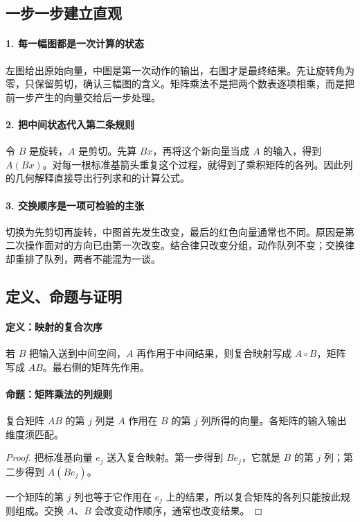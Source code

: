 \subsection*{一步一步建立直观}

\paragraph{1. 每一幅图都是一次计算的状态}

左图给出原始向量，中图是第一次动作的输出，右图才是最终结果。先让旋转角为零，只保留剪切，确认三幅图的含义。矩阵乘法不是把两个数表逐项相乘，而是把前一步产生的向量交给后一步处理。



\paragraph{2. 把中间状态代入第二条规则}

令 $B$ 是旋转，$A$ 是剪切。先算 $Bx$，再将这个新向量当成 $A$ 的输入，得到 $A(Bx)$。对每一根标准基箭头重复这个过程，就得到了乘积矩阵的各列。因此列的几何解释直接导出行列求和的计算公式。



\paragraph{3. 交换顺序是一项可检验的主张}

切换为先剪切再旋转，中图首先发生改变，最后的红色向量通常也不同。原因是第二次操作面对的方向已由第一次改变。结合律只改变分组，动作队列不变；交换律却重排了队列，两者不能混为一谈。



\subsection*{定义、命题与证明}

\paragraph{定义：映射的复合次序}

若 $B$ 把输入送到中间空间，$A$ 再作用于中间结果，则复合映射写成 $A\circ B$，矩阵写成 $AB$。最右侧的矩阵先作用。

\paragraph{命题：矩阵乘法的列规则}

复合矩阵 $AB$ 的第 $j$ 列是 $A$ 作用在 $B$ 的第 $j$ 列所得的向量。各矩阵的输入输出维度须匹配。

\begin{proof}

把标准基向量 $e_j$ 送入复合映射。第一步得到 $Be_j$，它就是 $B$ 的第 $j$ 列；第二步得到 $A(Be_j)$。

一个矩阵的第 $j$ 列也等于它作用在 $e_j$ 上的结果，所以复合矩阵的各列只能按此规则组成。交换 $A$、$B$ 会改变动作顺序，通常也改变结果。

\end{proof}
